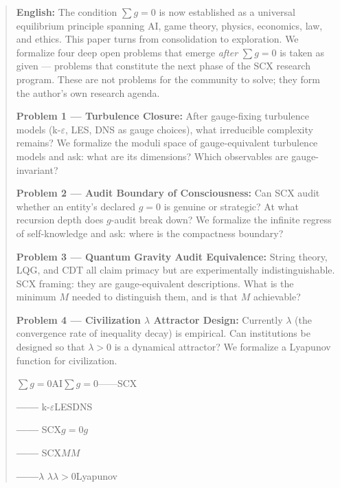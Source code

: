 \documentclass[12pt,a4paper]{article}
\theoremstyle{remark}
\begin{document}
\begin{abstract}
\noindent
\textbf{English:} The condition $\sum g = 0$ is now established as a universal equilibrium principle spanning AI, game theory, physics, economics, law, and ethics. This paper turns from consolidation to exploration. We formalize four deep open problems that emerge \textit{after} $\sum g = 0$ is taken as given — problems that constitute the next phase of the SCX research program. These are not problems for the community to solve; they form the author's own research agenda.

\textbf{Problem 1 — Turbulence Closure:} After gauge-fixing turbulence models (k-$\varepsilon$, LES, DNS as gauge choices), what irreducible complexity remains? We formalize the moduli space of gauge-equivalent turbulence models and ask: what are its dimensions? Which observables are gauge-invariant?

\textbf{Problem 2 — Audit Boundary of Consciousness:} Can SCX audit whether an entity's declared $g=0$ is genuine or strategic? At what recursion depth does $g$-audit break down? We formalize the infinite regress of self-knowledge and ask: where is the compactness boundary?

\textbf{Problem 3 — Quantum Gravity Audit Equivalence:} String theory, LQG, and CDT all claim primacy but are experimentally indistinguishable. SCX framing: they are gauge-equivalent descriptions. What is the minimum $M$ needed to distinguish them, and is that $M$ achievable?

\textbf{Problem 4 — Civilization $\lambda$ Attractor Design:} Currently $\lambda$ (the convergence rate of inequality decay) is empirical. Can institutions be designed so that $\lambda > 0$ is a dynamical attractor? We formalize a Lyapunov function for civilization.

\vspace{0.5cm}
\noindent
\textbf{} $\sum g = 0$AI$\sum g = 0$——SCX

\textbf{——} k-$\varepsilon$LESDNS

\textbf{——} SCX$g=0$$g$

\textbf{——} SCX$M$$M$

\textbf{——$\lambda$} $\lambda$$\lambda > 0$Lyapunov
\end{abstract}

\newpage
\tableofcontents
\newpage

\end{document}
